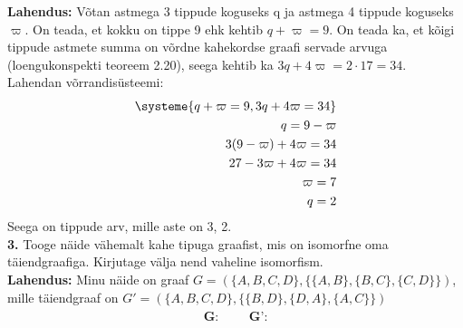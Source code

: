 \documentclass{article}
\begin{document}
\textbf{Lahendus:} V\~otan astmega 3 tippude koguseks q ja astmega 4 tippude koguseks $\varpi$. On teada, et kokku on tippe 9 ehk kehtib $q+\varpi=9$. On teada ka, et k\~oigi tippude astmete summa on v\~ordne kahekordse graafi servade arvuga (loengukonspekti teoreem 2.20), seega kehtib ka $3q+4\varpi=2\cdot17=34$. Lahendan v\~orrandis\"usteemi:
\begin{equation*}
\begin{aligned}
\systeme{
	q+\varpi=9,
	3q+4\varpi=34
}\\
q=9-\varpi\\
3(9-\varpi)+4\varpi=34\\
27-3\varpi+4\varpi=34\\
\varpi=7\\
q=2
\end{aligned}
\end{equation*}
Seega on tippude arv, mille aste on 3, 2.
\pagebreak\\
\textbf{3.} Tooge n\"aide v\"ahemalt kahe tipuga graafist, mis on isomorfne oma t\"aiendgraafiga. Kirjutage v\"alja nend vaheline isomorfism.\\
\textbf{Lahendus:} Minu n\"aide on graaf $G=(\{A,B,C,D\},\{\{A,B\},\{B,C\},\{C,D\}\})$, mille t\"aiendgraaf on $G'=(\{A,B,C,D\},\{\{B,D\},\{D,A\},\{A,C\}\})$
\begin{align*}
\begin{gathered}
\textbf{G:}
\end{gathered}
&&
\begin{gathered}
\textbf{G':}
\end{gathered}
\end{align*}
\begin {center}
\qquad\qquad\qquad\quad
{}
\end{center}
\end{document}
